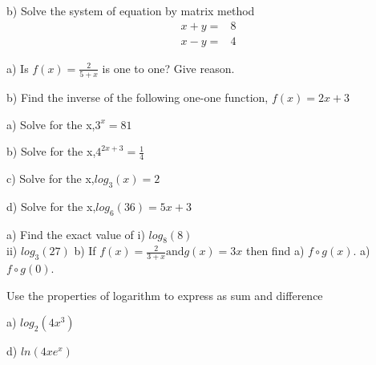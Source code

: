 \documentclass{exam}
\begin{document}
\begin{questions}
	
	 
	\subitem b) Solve the system of equation by matrix method
	\hfill\enspace\hrulefill
	\begin{align}
	\nonumber
	x+y=&8 \\ 
	\nonumber
	x-y=&4   
	\end{align}
	\vspace{6cm} 
	
		
	
	\clearpage
	\question 
	\subitem a) Is $f(x) =\frac{2}{5+x}$ is one to one? Give reason. 
	\hfill\enspace\hrulefill 
	\vspace{7cm}
	
	
	\subitem b) Find the inverse of the following one-one function, $f(x)=2x+3 $
	\hfill\enspace\hrulefill 
	
	
	
	\clearpage
					
	\question  
	\subitem a) Solve for the x,\quad \(3^{x}=81\) \hfill\enspace\hrulefill 
	\vspace{6cm}
	
	
	\subitem b) Solve for the x,\quad \( 4^{2x+3}=\frac{1}{4}\) \hfill\enspace\hrulefill 
	\vspace{6cm}
	
	\subitem c) Solve for the x,\quad \(log_3(x)=2\) \hfill\enspace\hrulefill 
	\vspace{6cm}
	
	\subitem d) Solve for the x,\quad \( log_6(36)=5x+3\) \hfill\enspace\hrulefill 
	\vspace{6cm}
		
	
	\question  
	\subitem a) Find the exact value of \subitem i) \(log_8(8)\)\\
	 \vspace{3cm}
   \subitem	ii) \(log_3(27)\)
	\vspace{3cm}
	\subitem b)  If $f(x) =\frac{2}{3+x} \mbox{and} g(x)=3x$ then find  
	\hfill\enspace\hrulefill
	\subitem a) $f\circ g(x)$. 
	\vspace{3cm}
	\subitem a) $f\circ g(0)$. 
	\vspace{3cm}
	
		
	
	\clearpage
	\question Use the properties of logarithm to express as sum and difference 
		
	\subitem a) \(log_{2}(4x^3)\) \hfill\enspace\hrulefill 
	
	\subitem d) \(ln(4xe^x)\) \hfill\enspace\hrulefill 


\end{questions}
\end{document}
